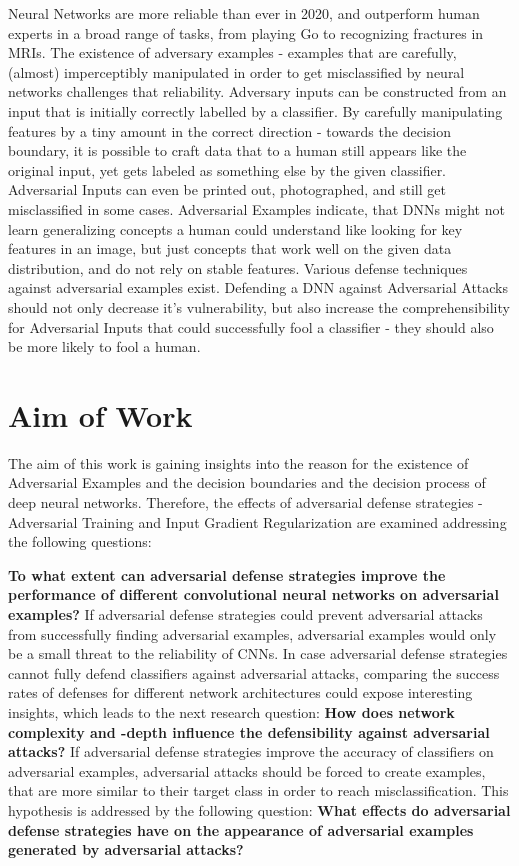 \documentclass[draft,final]{vutinfth} %
\begin{document}
Neural Networks are more reliable than ever in 2020, and outperform human experts in a broad range of tasks, from playing Go to recognizing fractures in MRIs.
The existence of adversary examples - examples that are carefully, (almost) imperceptibly manipulated in order to get misclassified by neural networks challenges that reliability.
Adversary inputs can be constructed from an input that is initially correctly labelled by a classifier.
By carefully manipulating features by a tiny amount in the correct direction - towards the decision boundary, it is possible to
craft data that to a human still appears like the original input, yet gets labeled as something else by the given classifier.
Adversarial Inputs can even be printed out, photographed, and still get misclassified in some cases.
Adversarial Examples indicate, that DNNs might not learn generalizing concepts a human could understand like looking for key features in an image, but just concepts that work well on the given data distribution, and do not rely on stable features.
Various defense techniques against adversarial examples exist.
Defending a DNN against Adversarial Attacks should not only decrease it's vulnerability, but also increase the comprehensibility for Adversarial Inputs that could successfully fool a classifier - they should also be more likely to fool a human.

\section{Aim of Work}

The aim of this work is gaining insights into the reason for the existence of Adversarial Examples and the decision boundaries and the decision process of deep neural networks.
Therefore, the effects of adversarial defense strategies - Adversarial Training and Input Gradient Regularization are examined addressing the following questions:

\textbf{To what extent can adversarial defense strategies improve the performance of different convolutional neural networks on adversarial examples?}
If adversarial defense strategies could prevent adversarial attacks from successfully finding adversarial examples, adversarial examples would only be a small threat to the reliability of CNNs.
In case adversarial defense strategies cannot fully defend classifiers against adversarial attacks, comparing the success rates of defenses for different network architectures could expose
interesting insights, which leads to the next research question:
\textbf{How does network complexity and -depth influence the defensibility against adversarial attacks?}
If adversarial defense strategies improve the accuracy of classifiers on adversarial examples, adversarial attacks should be forced to create examples, that are more similar to their target
class in order to reach misclassification.
This hypothesis is addressed by the following question:
\textbf{What effects do adversarial defense strategies have on the appearance of adversarial examples generated by adversarial attacks?}
\end{document}
